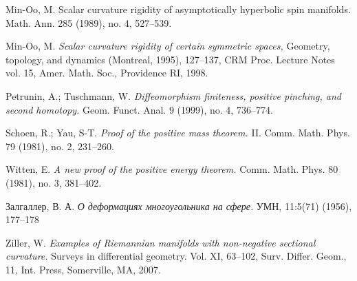 \documentclass[oneside,a4paper]{article}
\begin{document}
\begin{thebibliography}{52}
 Min-Oo, M.
Scalar curvature rigidity of asymptotically hyperbolic spin manifolds. Math. Ann. 285 (1989), no. 4, 527--539.

 Min-Oo, M. \textit{Scalar curvature rigidity of certain symmetric spaces,} Geometry, topology, and dynamics (Montreal, 1995), 127--137, CRM Proc. Lecture Notes vol. 15,
Amer. Math. Soc., Providence RI, 1998.

 Petrunin, A.; Tuschmann, W.
\textit{Diffeomorphism finiteness, positive pinching, and second homotopy.}
Geom. Funct. Anal. 9 (1999), no. 4, 736--774.




Schoen, R.; Yau, S-T. \textit{Proof of the positive mass theorem.} II. Comm. Math. Phys. 79 (1981), no. 2, 231--260.

 Witten, E. \textit{A new proof of the positive energy theorem.} Comm. Math. Phys. 80 (1981), no. 3, 381--402.

\begin{otherlanguage}{russian} Залгаллер, В. А.
\textit{О деформациях многоугольника на сфере.}
УМН, 11:5(71) (1956),  177--178	
\end{otherlanguage}

Ziller, W.
\textit{Examples of Riemannian manifolds with non-negative sectional curvature.} Surveys in differential geometry. Vol. XI, 63--102,
Surv. Differ. Geom., 11, Int. Press, Somerville, MA, 2007.

\end{thebibliography}
\end{document}
